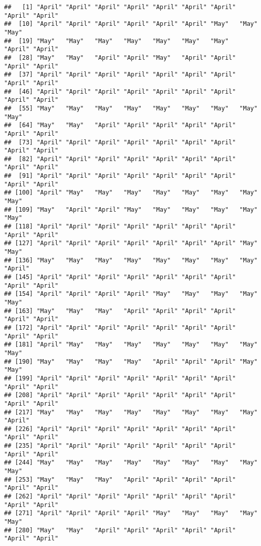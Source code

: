 \documentclass[
]{article}
\begin{document}
\begin{verbatim}
##   [1] "April" "April" "April" "April" "April" "April" "April" "April" "April"
##  [10] "April" "April" "April" "April" "April" "April" "May"   "May"   "May"  
##  [19] "May"   "May"   "May"   "May"   "May"   "May"   "May"   "April" "April"
##  [28] "May"   "May"   "April" "April" "May"   "April" "April" "April" "April"
##  [37] "April" "April" "April" "April" "April" "April" "April" "April" "April"
##  [46] "April" "April" "April" "April" "April" "April" "April" "April" "April"
##  [55] "May"   "May"   "May"   "May"   "May"   "May"   "May"   "May"   "May"  
##  [64] "May"   "May"   "April" "April" "April" "April" "April" "April" "April"
##  [73] "April" "April" "April" "April" "April" "April" "April" "April" "April"
##  [82] "April" "April" "April" "April" "April" "April" "April" "April" "April"
##  [91] "April" "April" "April" "April" "April" "April" "April" "April" "April"
## [100] "April" "May"   "May"   "May"   "May"   "May"   "May"   "May"   "May"  
## [109] "May"   "April" "April" "May"   "May"   "May"   "May"   "May"   "May"  
## [118] "April" "April" "April" "April" "April" "April" "April" "April" "April"
## [127] "April" "April" "April" "April" "April" "April" "April" "May"   "May"  
## [136] "May"   "May"   "May"   "May"   "May"   "May"   "May"   "May"   "April"
## [145] "April" "April" "April" "April" "April" "April" "April" "April" "April"
## [154] "April" "April" "April" "April" "May"   "May"   "May"   "May"   "May"  
## [163] "May"   "May"   "May"   "April" "April" "April" "April" "April" "April"
## [172] "April" "April" "April" "April" "April" "April" "April" "April" "April"
## [181] "April" "May"   "May"   "May"   "May"   "May"   "May"   "May"   "May"  
## [190] "May"   "May"   "May"   "May"   "April" "April" "April" "May"   "May"  
## [199] "April" "April" "April" "April" "April" "April" "April" "April" "April"
## [208] "April" "April" "April" "April" "April" "April" "April" "April" "April"
## [217] "May"   "May"   "May"   "May"   "May"   "May"   "May"   "May"   "April"
## [226] "April" "April" "April" "April" "April" "April" "April" "April" "April"
## [235] "April" "April" "April" "April" "April" "April" "April" "April" "April"
## [244] "May"   "May"   "May"   "May"   "May"   "May"   "May"   "May"   "May"  
## [253] "May"   "May"   "May"   "April" "April" "April" "April" "April" "April"
## [262] "April" "April" "April" "April" "April" "April" "April" "April" "April"
## [271] "April" "April" "April" "April" "May"   "May"   "May"   "May"   "May"  
## [280] "May"   "May"   "April" "April" "April" "April" "April" "April" "April"

\end{verbatim}
\end{document}
